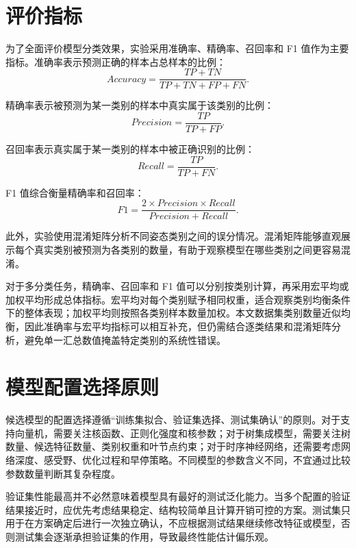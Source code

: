 \section{评价指标}
为了全面评价模型分类效果，实验采用准确率、精确率、召回率和 F1 值作为主要指标。准确率表示预测正确的样本占总样本的比例：
\begin{equation}
Accuracy=\frac{TP+TN}{TP+TN+FP+FN}.
\end{equation}

精确率表示被预测为某一类别的样本中真实属于该类别的比例：
\begin{equation}
Precision=\frac{TP}{TP+FP}.
\end{equation}

召回率表示真实属于某一类别的样本中被正确识别的比例：
\begin{equation}
Recall=\frac{TP}{TP+FN}.
\end{equation}

F1 值综合衡量精确率和召回率：
\begin{equation}
F1=\frac{2\times Precision\times Recall}{Precision+Recall}.
\end{equation}

此外，实验使用混淆矩阵分析不同姿态类别之间的误分情况。混淆矩阵能够直观展示每个真实类别被预测为各类别的数量，有助于观察模型在哪些类别之间更容易混淆。

对于多分类任务，精确率、召回率和 F1 值可以分别按类别计算，再采用宏平均或加权平均形成总体指标。宏平均对每个类别赋予相同权重，适合观察类别均衡条件下的整体表现；加权平均则按照各类别样本数量加权。本文数据集类别数量近似均衡，因此准确率与宏平均指标可以相互补充，但仍需结合逐类结果和混淆矩阵分析，避免单一汇总数值掩盖特定类别的系统性错误。

\section{模型配置选择原则}
候选模型的配置选择遵循“训练集拟合、验证集选择、测试集确认”的原则。对于支持向量机，需要关注核函数、正则化强度和核参数；对于树集成模型，需要关注树数量、候选特征数量、类别权重和叶节点约束；对于时序神经网络，还需要考虑网络深度、感受野、优化过程和早停策略。不同模型的参数含义不同，不宜通过比较参数数量判断其复杂程度。

验证集性能最高并不必然意味着模型具有最好的测试泛化能力。当多个配置的验证结果接近时，应优先考虑结果稳定、结构较简单且计算开销可控的方案。测试集只用于在方案确定后进行一次独立确认，不应根据测试结果继续修改特征或模型，否则测试集会逐渐承担验证集的作用，导致最终性能估计偏乐观。

